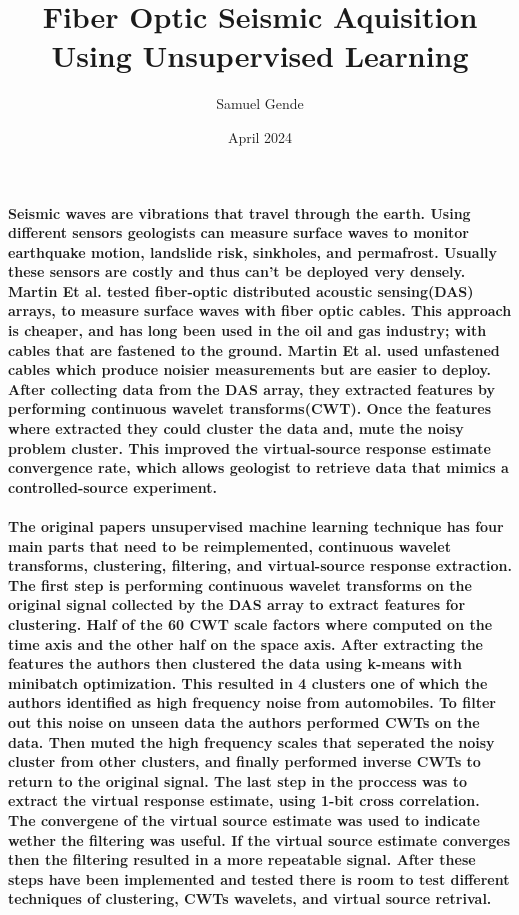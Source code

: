 \documentclass{article}
\title{
Fiber Optic Seismic Aquisition Using Unsupervised Learning}
\author{Samuel Gende }
\date{April 2024}
\begin{document}
\maketitle

\paragraph{Seismic waves are vibrations that travel through the earth. Using different sensors geologists can measure surface waves to monitor earthquake motion, landslide risk, sinkholes, and permafrost. Usually these sensors are costly and thus can't be deployed very densely. Martin Et al. tested fiber-optic distributed acoustic sensing(DAS) arrays, to measure surface waves with fiber optic cables. This approach is cheaper, and has long been used in the oil and gas industry; with cables that are fastened to the ground. Martin Et al. used unfastened cables which produce noisier measurements but are easier to deploy. After collecting data from the DAS array, they extracted features by performing continuous wavelet transforms(CWT). Once the features where extracted they could cluster the data and, mute the noisy problem cluster. This improved the virtual-source response estimate convergence rate, which allows geologist to retrieve data that mimics a controlled-source experiment. }

\paragraph{The original papers unsupervised machine learning technique has four main parts that need to be reimplemented, continuous wavelet transforms, clustering, filtering, and virtual-source response extraction. The first step is performing continuous wavelet transforms on the original signal collected by the DAS array to extract features for clustering. Half of the 60 CWT scale factors where computed on the time axis and the other half on the space axis. After extracting the features the authors then clustered the data using k-means with minibatch optimization. This resulted in 4 clusters one of which the authors identified as high frequency noise from automobiles. To filter out this noise on unseen data the authors performed CWTs on the data. Then muted the high frequency scales that seperated the noisy cluster from other clusters, and finally performed inverse CWTs to return to the original signal. The last step in the proccess was to extract the virtual response estimate, using 1-bit cross correlation. The convergene of the virtual source estimate was used to indicate wether the filtering was useful. If the virtual source estimate converges then the filtering resulted in a more repeatable signal. After these steps have been implemented and tested there is room to test different techniques of clustering, CWTs wavelets, and virtual source retrival. }
\end{document}

